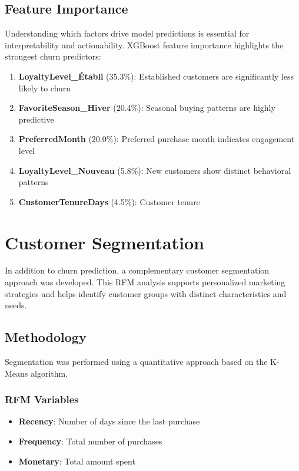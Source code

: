 \documentclass[12pt,a4paper]{article}
\begin{document}
\subsection{Feature Importance}

Understanding which factors drive model predictions is essential for interpretability and actionability. XGBoost feature importance highlights the strongest churn predictors:

\begin{enumerate}
    \item \textbf{LoyaltyLevel\_Établi} (35.3\%): Established customers are significantly less likely to churn
    \item \textbf{FavoriteSeason\_Hiver} (20.4\%): Seasonal buying patterns are highly predictive
    \item \textbf{PreferredMonth} (20.0\%): Preferred purchase month indicates engagement level
    \item \textbf{LoyaltyLevel\_Nouveau} (5.8\%): New customers show distinct behavioral patterns
    \item \textbf{CustomerTenureDays} (4.5\%): Customer tenure
\end{enumerate}

\section{Customer Segmentation}

In addition to churn prediction, a complementary customer segmentation approach was developed. This RFM analysis supports personalized marketing strategies and helps identify customer groups with distinct characteristics and needs.

\subsection{Methodology}

Segmentation was performed using a quantitative approach based on the K-Means algorithm.

\subsubsection{RFM Variables}
\begin{itemize}
    \item \textbf{Recency}: Number of days since the last purchase
    \item \textbf{Frequency}: Total number of purchases
    \item \textbf{Monetary}: Total amount spent
\end{itemize}
\end{document}
